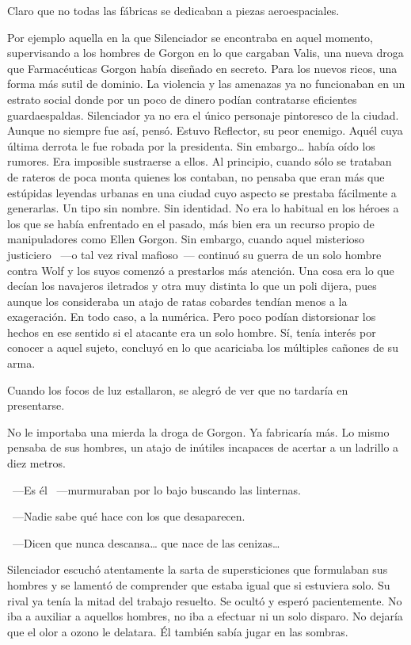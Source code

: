 Claro que no todas las fábricas se dedicaban a piezas aeroespaciales.

Por ejemplo aquella en la que Silenciador se encontraba en aquel momento, supervisando a los hombres de Gorgon en lo que cargaban Valis, una nueva droga que Farmacéuticas Gorgon había diseñado en secreto. Para los nuevos ricos, una forma más sutil de dominio. La violencia y las amenazas ya no funcionaban en un estrato social donde por un poco de dinero podían contratarse eficientes guardaespaldas. Silenciador ya no era el único personaje pintoresco de la ciudad. Aunque no siempre fue así, pensó. Estuvo Reflector, su peor enemigo. Aquél cuya última derrota le fue robada por la presidenta. Sin embargo\dots{} había oído los rumores. Era imposible sustraerse a ellos. Al principio, cuando sólo se trataban de rateros de poca monta quienes los contaban, no pensaba que eran más que estúpidas leyendas urbanas en una ciudad cuyo aspecto se prestaba fácilmente a generarlas. Un tipo sin nombre. Sin identidad. No era lo habitual en los héroes a los que se había enfrentado en el pasado, más bien era un recurso propio de manipuladores como Ellen Gorgon. Sin embargo, cuando aquel misterioso justiciero ~---o tal vez rival mafioso~--- continuó su guerra de un solo hombre contra Wolf y los suyos comenzó a prestarlos más atención. Una cosa era lo que decían los navajeros iletrados y otra muy distinta lo que un poli dijera, pues aunque los consideraba un atajo de ratas cobardes tendían menos a la exageración. En todo caso, a la numérica. Pero poco podían distorsionar los hechos en ese sentido si el atacante era un solo hombre. Sí, tenía interés por conocer a aquel sujeto, concluyó en lo que acariciaba los múltiples cañones de su arma.

Cuando los focos de luz estallaron, se alegró de ver que no tardaría en presentarse.

No le importaba una mierda la droga de Gorgon. Ya fabricaría más. Lo mismo pensaba de sus hombres, un atajo de inútiles incapaces de acertar a un ladrillo a diez metros.

~---Es él ~---murmuraban por lo bajo buscando las linternas.

~---Nadie sabe qué hace con los que desaparecen.

~---Dicen que nunca descansa\dots{} que nace de las cenizas\dots{}

Silenciador escuchó atentamente la sarta de supersticiones que formulaban sus hombres y se lamentó de comprender que estaba igual que si estuviera solo. Su rival ya tenía la mitad del trabajo resuelto. Se ocultó y esperó pacientemente. No iba a auxiliar a aquellos hombres, no iba a efectuar ni un solo disparo. No dejaría que el olor a ozono le delatara. Él también sabía jugar en las sombras.

